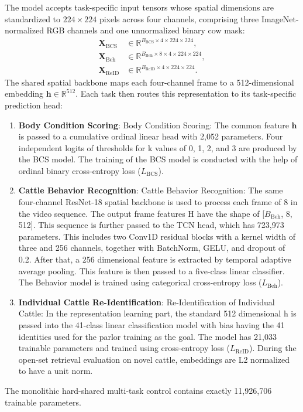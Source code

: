 The model accepts task-specific input tensors whose spatial dimensions are standardized to $224 \times 224$ pixels across four channels, comprising three ImageNet-normalized RGB channels and one unnormalized binary cow mask:
\begin{align}
 \mathbf{X}_{\mathrm{BCS}} &\in \mathbb{R}^{B_{\mathrm{BCS}} \times 4 \times 224 \times 224}, \\
 \mathbf{X}_{\mathrm{Beh}} &\in \mathbb{R}^{B_{\mathrm{Beh}} \times 8 \times 4 \times 224 \times 224}, \\
 \mathbf{X}_{\mathrm{ReID}} &\in \mathbb{R}^{B_{\mathrm{ReID}} \times 4 \times 224 \times 224}.
\end{align}
The shared spatial backbone maps each four-channel frame to a 512-dimensional embedding $\mathbf{h} \in \mathbb{R}^{512}$. Each task then routes this representation to its task-specific prediction head:
\begin{enumerate}
 \item \textbf{Body Condition Scoring}: Body Condition Scoring: The common feature $\mathbf{h}$ is passed to a cumulative ordinal linear head with 2,052 parameters. Four independent logits of thresholds for k values of 0, 1, 2, and 3 are produced by the BCS model. The training of the BCS model is conducted with the help of ordinal binary cross-entropy loss ($L_{\mathrm{BCS}}$).
 \item \textbf{Cattle Behavior Recognition}: Cattle Behavior Recognition: The same four-channel ResNet-18 spatial backbone is used to process each frame of 8 in the video sequence. The output frame features H have the shape of [$B_{\mathrm{Beh}}$, 8, 512]. This sequence is further passed to the TCN head, which has 723,973 parameters. This includes two Conv1D residual blocks with a kernel width of three and 256 channels, together with BatchNorm, GELU, and dropout of 0.2. After that, a 256 dimensional feature is extracted by temporal adaptive average pooling. This feature is then passed to a five-class linear classifier. The Behavior model is trained using categorical cross-entropy loss ($L_{\mathrm{Beh}}$).
 \item \textbf{Individual Cattle Re-Identification}: Re-Identification of Individual Cattle: In the representation learning part, the standard 512 dimensional h is passed into the 41-class linear classification model with bias having the 41 identities used for the parlor training as the goal. The model has 21,033 trainable parameters and trained using cross-entropy loss ($L_{\mathrm{ReID}}$). During the open-set retrieval evaluation on novel cattle, embeddings are L2 normalized to have a unit norm.
\end{enumerate}
The monolithic hard-shared multi-task control contains exactly 11,926,706 trainable parameters.

